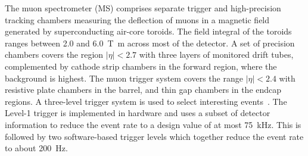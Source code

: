 The muon spectrometer (MS) comprises separate trigger and
high-precision tracking chambers measuring the deflection of muons in a magnetic field generated by superconducting air-core toroids.
The field integral of the toroids ranges between \num{2.0} and \SI{6.0}{\tesla\metre}
across most of the detector. 
A set of precision chambers covers the region \(|\eta| < 2.7\) with three layers of monitored drift tubes,
complemented by cathode strip chambers in the forward region, where the background is highest.
The muon trigger system covers the range \(|\eta| < 2.4\) with resistive plate chambers in the barrel, and thin gap chambers in the endcap regions.
A three-level trigger system is used to select interesting events~\cite{PERF-2011-02}.
The Level-1 trigger is implemented in hardware and uses a subset of detector information
to reduce the event rate to a design value of at most \SI{75}{\kHz}.
This is followed by two software-based trigger levels which together reduce the event rate to about \SI{200}{\Hz}.

